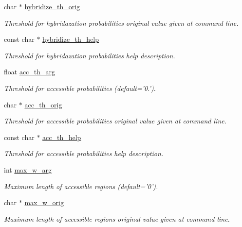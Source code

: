 \begin{DoxyCompactItemize}
char $\ast$ \hyperlink{structgengetopt__args__info_af5ad30ce558e2a362b45f25eac7c2d8a}{hybridize\+\_\+th\+\_\+orig}
\begin{DoxyCompactList}\small\item\em Threshold for hybridazation probabilities original value given at command line. \end{DoxyCompactList}\item 
const char $\ast$ \hyperlink{structgengetopt__args__info_a80b3003903fe0c9bfe6cacffcff587ae}{hybridize\+\_\+th\+\_\+help}
\begin{DoxyCompactList}\small\item\em Threshold for hybridazation probabilities help description. \end{DoxyCompactList}\item 
float \hyperlink{structgengetopt__args__info_add7c709ed6c1601e389c7373250e4117}{acc\+\_\+th\+\_\+arg}
\begin{DoxyCompactList}\small\item\em Threshold for accessible probabilities (default='0.'). \end{DoxyCompactList}\item 
char $\ast$ \hyperlink{structgengetopt__args__info_ae8040a2293d3668f9afd87c7cc487591}{acc\+\_\+th\+\_\+orig}
\begin{DoxyCompactList}\small\item\em Threshold for accessible probabilities original value given at command line. \end{DoxyCompactList}\item 
const char $\ast$ \hyperlink{structgengetopt__args__info_a6c25c2ca04d50ecd361603514540046b}{acc\+\_\+th\+\_\+help}
\begin{DoxyCompactList}\small\item\em Threshold for accessible probabilities help description. \end{DoxyCompactList}\item 
int \hyperlink{structgengetopt__args__info_a9bc5ef56f828d6fb7ce0525884d6ed07}{max\+\_\+w\+\_\+arg}
\begin{DoxyCompactList}\small\item\em Maximum length of accessible regions (default='0'). \end{DoxyCompactList}\item 
char $\ast$ \hyperlink{structgengetopt__args__info_a13203309b03664cded43fc7c50065c15}{max\+\_\+w\+\_\+orig}
\begin{DoxyCompactList}\small\item\em Maximum length of accessible regions original value given at command line. \end{DoxyCompactList}\item 

\end{DoxyCompactItemize}
